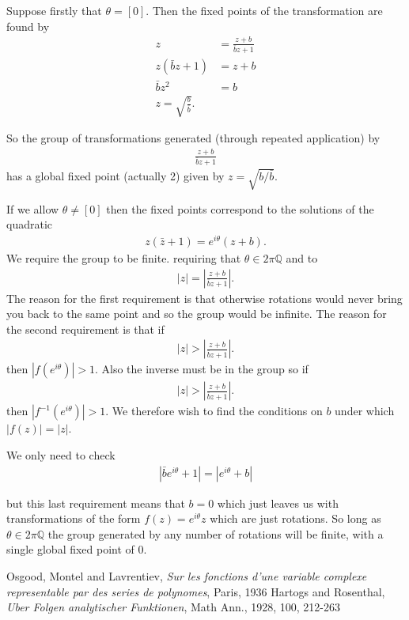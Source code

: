 \documentclass{unswmaths}
\begin{document}
Suppose firstly that $ \theta = [0] $. Then the fixed points of the transformation are found by
\begin{align}
	z 	&= \frac{z + b}{\bar{b}z + 1} \\
	z(\bar{b}z + 1) &= z + b \\
	\bar{b}z^2 &= b \\
	z = \sqrt{\frac{b}{\bar{b}}}.
\end{align}

So the group of transformations generated (through repeated application) by
\begin{align}
	\frac{z+b}{\bar{b}{z} + 1}
\end{align}
has a global fixed point (actually 2) given by $ z = \sqrt{ b / \bar{b}} $.

If we allow $ \theta \neq [0] $ then the fixed points correspond to the solutions of the quadratic
\begin{align}
	z(\bar{z} + 1) = e^{i\theta}(z+ b).
\end{align}
We require the group to be finite. 
requiring that $ \theta \in 2\pi \mathbb{Q} $ and to
\begin{align}
	|z| = \left| \frac{z+b}{\bar{b}z + 1} \right|.
\end{align}
The reason for the first requirement is that otherwise rotations would never bring you back to the same point and so the group would be infinite. The reason for the second requirement is that if
\begin{align}
	|z| > \left| \frac{z+b}{\bar{b}z + 1} \right|.
\end{align}
then $ |f(e^{i\theta})| > 1 $. Also the inverse must be in the group so if 
\begin{align}
	|z| > \left| \frac{z+b}{\bar{b}z + 1} \right|.
\end{align}
then $ |f^{-1}(e^{i\theta})| > 1 $.
We therefore wish to find the conditions on $ b $ under which $ |f(z)| = |z| $. 

We only need to check
\begin{align}
	|\bar{b}e^{i\theta} + 1| = |e^{i\theta} + b|
\end{align}

but this last requirement means that $ b = 0 $ which just leaves us with transformations of the form
$ f(z) = e^{i \theta} z $ which are just rotations. So long as $ \theta \in 2\pi\mathbb{Q} $ the group generated by any number of rotations will be finite, with a single global fixed point of 0.

\begin{thebibliography}{9}

	Osgood, Montel and Lavrentiev,
	\emph{Sur les fonctions d'une variable complexe representable par des series de polynomes},
	Paris,
	1936
	Hartogs and Rosenthal,
	\emph{Uber Folgen analytischer Funktionen},
	Math Ann.,
	1928,
	100,
	212-263
\end{thebibliography}
\end{document}
